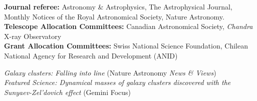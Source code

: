 \documentclass[11pt]{article}
\begin{document}
\noindent 
\textbf{Journal referee:} Astronomy \& Astrophysics, The Astrophysical Journal, Monthly Notices of the Royal Astronomical Society, Nature Astronomy.\\
\noindent
\textbf{Telescope Allocation Committees:}
Canadian Astronomical Society, \textit{Chandra} X-ray Observatory\\
\noindent
\textbf{Grant Allocation Committees:} Swiss National Science Foundation, Chilean National Agency for Research and Development (ANID)




\noindent
 \emph{Galaxy clusters: Falling into line} (Nature Astronomy \emph{News \& Views})\\
 \emph{Featured Science: Dynamical masses of galaxy clusters discovered with the Sunyaev-Zel'dovich effect} (Gemini Focus)

\end{document}
